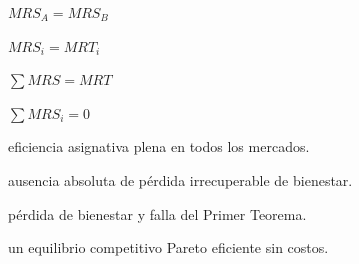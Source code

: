 \begin{opts}
    \item $MRS_A = MRS_B$
    \item $MRS_i = MRT_i$
    \item $\sum MRS = MRT$
    \item $\sum MRS_i = 0$
\end{opts}

\begin{opts}
    \item eficiencia asignativa plena en todos los mercados.
    \item ausencia absoluta de pérdida irrecuperable de bienestar.
    \item pérdida de bienestar y falla del Primer Teorema.
    \item un equilibrio competitivo Pareto eficiente sin costos.
\end{opts}
